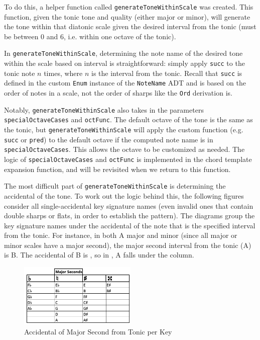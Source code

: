 \documentclass{report}
\begin{document}
To do this, a helper function called \verb.generateToneWithinScale. was created. This function, given the tonic tone and quality (either major or minor), will generate the tone within that diatonic scale given the desired interval from the tonic (must be between 0 and 6, i.e. within one octave of the tonic). 

In \verb.generateToneWithinScale., determining the note name of the desired tone within the scale based on interval is straightforward: simply apply \verb.succ. to the tonic note $n$ times, where $n$ is the interval from the tonic. Recall that \verb.succ. is defined in the custom \verb.Enum. instance of the \verb.NoteName. ADT and is based on the order of notes in a scale, not the order of sharps like the \verb.Ord. derivation is.

Notably, \verb.generateToneWithinScale. also takes in the parameters \verb.specialOctaveCases. and \verb.octFunc.. The default octave of the tone is the same as the tonic, but \verb.generateToneWithinScale. will apply the custom function (e.g. \verb.succ. or \verb.pred.) to the default octave if the computed note name is in \verb.specialOctaveCases.. This allows the octave to be customized as needed. The logic of \verb.specialOctaveCases. and \verb.octFunc. is implemented in the chord template expansion function, and will be revisited when we return to this function.

The most difficult part of \verb.generateToneWithinScale. is determining the accidental of the tone. To work out the logic behind this, the following figures consider all single-accidental key signature names (even invalid ones that contain double sharps or flats, in order to establish the pattern). The diagrams group the key signature names under the accidental of the note that is the specified interval from the tonic. For instance, in both A\musFlat\; major and minor (since all major or minor scales have a major second), the major second interval from the tonic (A\musFlat) is B\musFlat. The accidental of B\musFlat\; is \musFlat, so in , A\musFlat\; falls under the \musFlat\; column.

\begin{figure}[h!]
\centering
\includegraphics[width=0.5\textwidth]{images/maj_seconds}
\caption{Accidental of Major Second from Tonic per Key}
\label{maj_seconds}
\end{figure}
\end{document}

